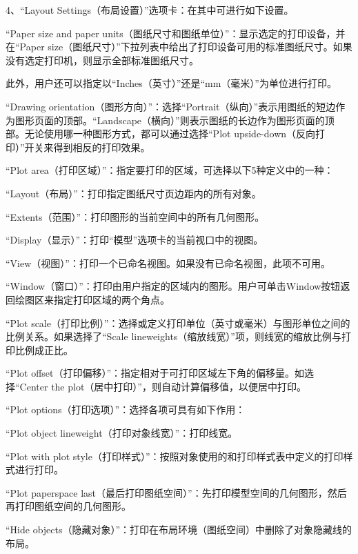 4、“Layout Settings（布局设置）”选项卡：在其中可进行如下设置。

\begin{compactitem}
\item “Paper size and paper units（图纸尺寸和图纸单位）”：显示选定的打印设备，并在“Paper size（图纸尺寸）”下拉列表中给出了打印设备可用的标准图纸尺寸。如果没有选定打印机，则显示全部标准图纸尺寸。

此外，用户还可以指定以“Inches（英寸）”还是“mm（毫米）”为单位进行打印。

\item “Drawing orientation（图形方向）”：选择“Portrait（纵向）”表示用图纸的短边作为图形页面的顶部。“Landscape（横向）”则表示图纸的长边作为图形页面的顶部。无论使用哪一种图形方式，都可以通过选择“Plot upside-down（反向打印）”开关来得到相反的打印效果。

\item “Plot area（打印区域）”：指定要打印的区域，可选择以下5种定义中的一种：

\begin{compactenum}
\item “Layout（布局）”：打印指定图纸尺寸页边距内的所有对象。
\item “Extents（范围）”：打印图形的当前空间中的所有几何图形。
\item “Display（显示）”：打印“模型”选项卡的当前视口中的视图。
\item “View（视图）”：打印一个已命名视图。如果没有已命名视图，此项不可用。
\item “Window（窗口）”：打印由用户指定的区域内的图形。用户可单击Window按钮返回绘图区来指定打印区域的两个角点。
\end{compactenum}

\item “Plot scale（打印比例）”：选择或定义打印单位（英寸或毫米）与图形单位之间的比例关系。如果选择了“Scale lineweights（缩放线宽）”项，则线宽的缩放比例与打印比例成正比。

\item “Plot offset（打印偏移）”：指定相对于可打印区域左下角的偏移量。如选择“Center the plot（居中打印）”，则自动计算偏移值，以便居中打印。

\item “Plot options（打印选项）”：选择各项可具有如下作用：

\begin{compactenum}
\item “Plot object lineweight（打印对象线宽）”：打印线宽。
\item “Plot with plot style（打印样式）”：按照对象使用的和打印样式表中定义的打印样式进行打印。
\item “Plot paperspace last（最后打印图纸空间）”：先打印模型空间的几何图形，然后再打印图纸空间的几何图形。
\item “Hide objects（隐藏对象）”：打印在布局环境（图纸空间）中删除了对象隐藏线的布局。
\end{compactenum}

\end{compactitem}

